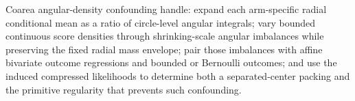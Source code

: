 Coarea angular-density confounding handle: expand each arm-specific radial conditional mean as a ratio of circle-level angular integrals; vary bounded continuous score densities through shrinking-scale angular imbalances while preserving the fixed radial mass envelope; pair those imbalances with affine bivariate outcome regressions and bounded or Bernoulli outcomes; and use the induced compressed likelihoods to determine both a separated-center packing and the primitive regularity that prevents such confounding.